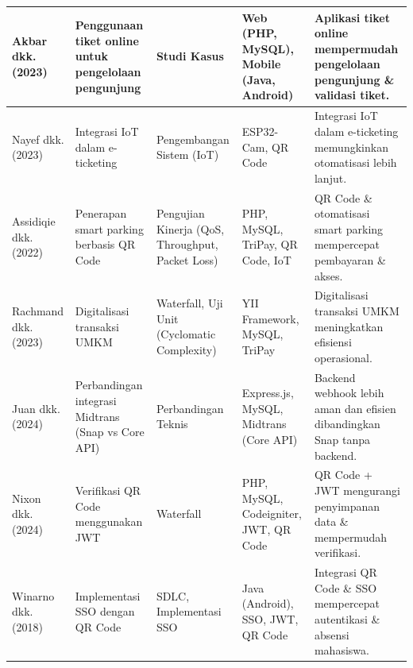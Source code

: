 \begin{longtable}{|p{1.75cm}|p{3cm}|p{2.25cm}|p{2.75cm}|p{4cm}|}
    Akbar dkk.(2023) \cite{akbar2023perancangan}                   & Penggunaan tiket online untuk pengelolaan pengunjung & Studi Kasus                                      & Web (PHP, MySQL), Mobile (Java, Android) & Aplikasi tiket online mempermudah pengelolaan pengunjung \& validasi tiket. \\
    \hline

    Nayef dkk. (2023) \cite{HanJie_Alduais_2023}                   & Integrasi IoT dalam e-ticketing                      & Pengembangan Sistem (IoT)                        & ESP32-Cam, QR Code                       & Integrasi IoT dalam e-ticketing memungkinkan otomatisasi lebih lanjut.      \\
    \hline

    Assidiqie dkk. (2022) \cite{assidiqie2022implementasi}         & Penerapan smart parking berbasis QR Code             & Pengujian Kinerja (QoS, Throughput, Packet Loss) & PHP, MySQL, TriPay, QR Code, IoT         & QR Code \& otomatisasi smart parking mempercepat pembayaran \& akses.       \\
    \hline

    Rachmand dkk. (2023) \cite{Rachman_Rusdianto_Wihandika_2023}   & Digitalisasi transaksi UMKM                          & Waterfall, Uji Unit (Cyclomatic Complexity)      & YII Framework, MySQL, TriPay             & Digitalisasi transaksi UMKM meningkatkan efisiensi operasional.             \\
    \hline

    Juan dkk. (2024) \cite{Alma_Prihanto_2024}                     & Perbandingan integrasi Midtrans (Snap vs Core API)   & Perbandingan Teknis                              & Express.js, MySQL, Midtrans (Core API)   & Backend webhook lebih aman dan efisien dibandingkan Snap tanpa backend.     \\
    \hline

    Nixon dkk. (2024) \cite{Rahman_Erzed_2024}                     & Verifikasi QR Code menggunakan JWT                   & Waterfall                                        & PHP, MySQL, Codeigniter, JWT, QR Code    & QR Code + JWT mengurangi penyimpanan data \& mempermudah verifikasi.        \\
    \hline

    Winarno dkk. (2018) \cite{2018/11}                             & Implementasi SSO dengan QR Code                      & SDLC, Implementasi SSO                           & Java (Android), SSO, JWT, QR Code        & Integrasi QR Code \& SSO mempercepat autentikasi \& absensi mahasiswa.      \\
    \hline
\end{longtable}

